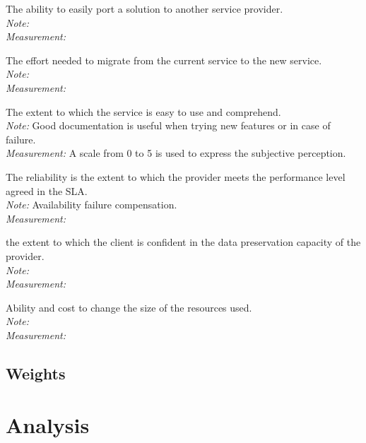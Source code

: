 \documentclass[a4paper,11pt]{article}
\begin{document}
\begin{description}[parsep=1pt,listparindent=\parindent,labelindent=\parindent,font=$\bullet$\ ]
  \item[Portability:] The ability to easily port a solution to another service provider.\\%
    \emph{Note:} \\
    \emph{Measurement:} 

  \item[Migration:] The effort needed to migrate from the current service to the new service.\\
    \emph{Note:} \\
    \emph{Measurement:} 

  \item[Usability:] The extent to which the service is easy to use and comprehend.\\
    \emph{Note:} Good documentation is useful when trying new features or in case of failure.\\
    \emph{Measurement:} A scale from 0 to 5 is used to express the subjective perception.

  \item[Reliability:] The reliability is the extent to which the provider meets the performance level agreed in the SLA.\\
    \emph{Note:} Availability failure compensation.\\
    \emph{Measurement:} 

  \item[Security backup:] the extent to which the client is confident in the data preservation capacity of the provider.\\
    \emph{Note:} \\
    \emph{Measurement:} 

  \item[Scalability:] Ability and cost to change the size of the resources used.\\
    \emph{Note:} \\
    \emph{Measurement:} 

\end{description}


\subsection{Weights}


\section{Analysis}
\end{document}
